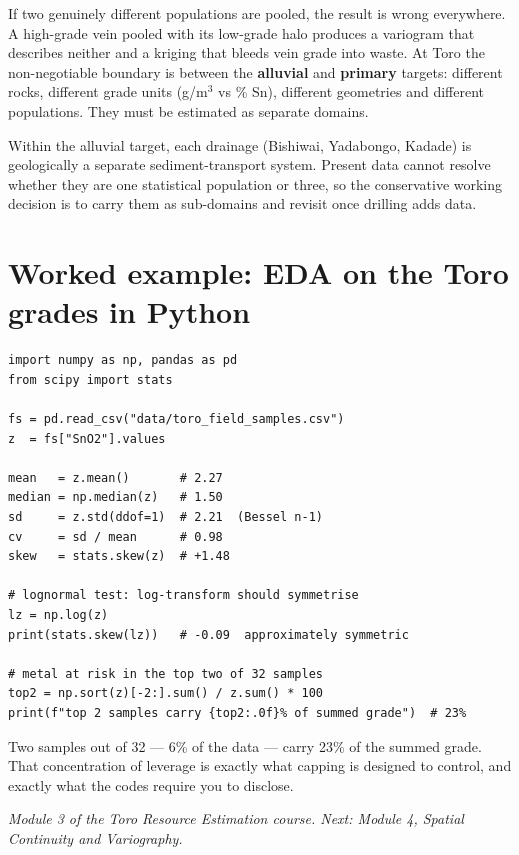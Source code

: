 \documentclass[11pt]{article}
\begin{document}
\begin{pitbox}
If two genuinely different populations are pooled, the result is wrong
everywhere. A high-grade vein pooled with its low-grade halo produces a
variogram that describes neither and a kriging that bleeds vein grade
into waste. At Toro the non-negotiable boundary is between the
\textbf{alluvial} and \textbf{primary} targets: different rocks,
different grade units (g/m$^3$ vs \% Sn), different geometries and
different populations. They must be estimated as separate domains.
\end{pitbox}

Within the alluvial target, each drainage (Bishiwai, Yadabongo, Kadade)
is geologically a separate sediment-transport system. Present data
cannot resolve whether they are one statistical population or three, so
the conservative working decision is to carry them as sub-domains and
revisit once drilling adds data.

\section{Worked example: EDA on the Toro grades in Python}

\begin{lstlisting}
import numpy as np, pandas as pd
from scipy import stats

fs = pd.read_csv("data/toro_field_samples.csv")
z  = fs["SnO2"].values

mean   = z.mean()       # 2.27
median = np.median(z)   # 1.50
sd     = z.std(ddof=1)  # 2.21  (Bessel n-1)
cv     = sd / mean      # 0.98
skew   = stats.skew(z)  # +1.48

# lognormal test: log-transform should symmetrise
lz = np.log(z)
print(stats.skew(lz))   # -0.09  approximately symmetric

# metal at risk in the top two of 32 samples
top2 = np.sort(z)[-2:].sum() / z.sum() * 100
print(f"top 2 samples carry {top2:.0f}% of summed grade")  # 23%
\end{lstlisting}

Two samples out of 32 --- 6\% of the data --- carry 23\% of the summed
grade. That concentration of leverage is exactly what capping is designed
to control, and exactly what the codes require you to disclose.

\vspace{4pt}{\color{line}\hrule}\vspace{4pt}
{\small\itshape Module 3 of the Toro Resource Estimation course. Next:
Module 4, Spatial Continuity and Variography.}
\end{document}
